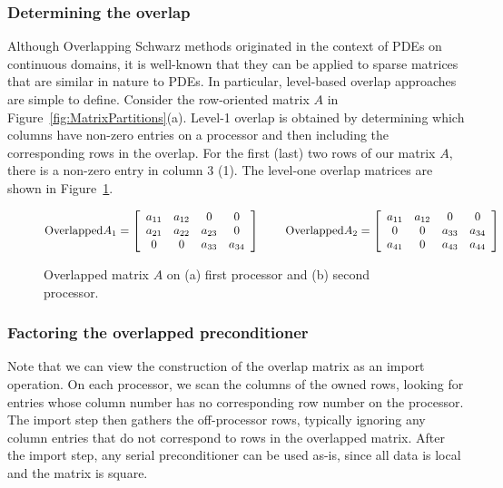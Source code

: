 \documentclass[10pt,relax]{PetraObjectModel}
\begin{document}
\subsubsection{Determining the overlap}

Although Overlapping Schwarz methods originated in the context of
PDEs on continuous domains, it is well-known that they can be
applied to sparse matrices that are similar in nature to PDEs.  In
particular, level-based overlap approaches are simple to define.
Consider the row-oriented matrix $A$ in
Figure~\ref{fig:MatrixPartitions}(a). Level-1 overlap is obtained by
determining which columns have non-zero entries on a processor and
then including the corresponding rows in the overlap.  For the first
(last) two rows of our matrix $A$, there is a non-zero entry in
column 3 (1). The level-one overlap matrices are shown in
Figure~\ref{fig:OverlapMatrixPartitions}.
\begin{figure}
\begin{center}
\begin{equation}
\textrm{Overlapped} A_1=\left[
\begin{array}{cccc}
a_{11} & a_{12}&      0 &      0\\
a_{21} & a_{22}& a_{23} &      0\\
     0 &     0 & a_{33} & a_{34}\\
\end{array}
\right] \hspace{.3in} \textrm{Overlapped} A_2 =\left[
\begin{array}{cccc}
a_{11} & a_{12}&      0 &      0\\
     0 &     0 & a_{33} & a_{34}\\
a_{41} &     0 & a_{43} & a_{44}\\
\end{array}
\right]
\end{equation}
\end{center}
\caption{\label{fig:OverlapMatrixPartitions} Overlapped matrix $A$
on (a) first processor and (b) second processor.}
\end{figure}

\subsubsection{Factoring the overlapped preconditioner}

Note that we can view the construction of the overlap matrix as an
import operation.  On each processor, we scan the columns of the
owned rows, looking for entries whose column number has no
corresponding row number on the processor.  The import step then
gathers the off-processor rows, typically ignoring any column
entries that do not correspond to rows in the overlapped matrix.
After the import step, any serial preconditioner can be used as-is,
since all data is local and the matrix is square.
\end{document}
